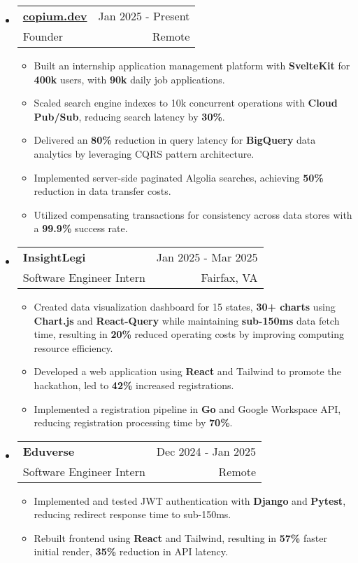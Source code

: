 \documentclass[letterpaper,11pt]{article}
\makeatletter
\newcommand{\resumeItem}[1]{
  \item{
    {#1}
  }
}
\newcommand{\resumeSubheading}[4]{
    \item
    \begin{tabular*}{0.985\textwidth}[t]{l@{\extracolsep{\fill}}r@{\hspace{-0.1in}}}
        {\textbf{#1}} & {#2} \\
        #3 &  #4 \\
    \end{tabular*}\vspace{-5pt}
}
\newcommand{\resumeSubHeadingListStart}{\begin{itemize}[leftmargin=0.00in, rightmargin=-0.2in, label={}]\vspace{3pt}}
\newcommand{\resumeSubHeadingListEnd}{\end{itemize}\vspace{-5pt}}
\newcommand{\resumeItemListStart}{\vspace{3pt}\begin{itemize}[leftmargin=0.15in, rightmargin=0.15in]}
\newcommand{\resumeItemListEnd}{\end{itemize}\vspace{-5pt}}
\makeatother
\begin{document}
\resumeSubHeadingListStart
\resumeSubheading
{\href{https://www.copium.dev}{copium.dev}} {Jan 2025 - Present}
{Founder} {Remote}
\resumeItemListStart 
\resumeItem{Built an internship application management platform with \textbf{SvelteKit} for \textbf{400k} users, with \textbf{90k} daily job applications.}
\resumeItem{Scaled search engine indexes to 10k concurrent operations with \textbf{Cloud Pub/Sub}, reducing search latency by \textbf{30\%}.}
\resumeItem{Delivered an \textbf{80\%} reduction in query latency for \textbf{BigQuery} data analytics by leveraging CQRS pattern architecture.}
\resumeItem{Implemented server-side paginated Algolia searches, achieving \textbf{50\%} reduction in data transfer costs.}
\resumeItem{Utilized compensating transactions for consistency across data stores with a \textbf{99.9\%} success rate.}
\resumeItemListEnd
\resumeSubHeadingListEnd

\resumeSubHeadingListStart
\resumeSubheading
{InsightLegi} {Jan 2025 - Mar 2025}
{Software Engineer Intern} {Fairfax, VA}
\resumeItemListStart 
\resumeItem{Created data visualization dashboard for 15 states, \textbf{30+ charts} using \textbf{Chart.js} and \textbf{React-Query} while maintaining \textbf{sub-150ms} data fetch time, resulting in \textbf{20\%} reduced operating costs by improving computing resource efficiency.}
\resumeItem{Developed a web application using \textbf{React} and Tailwind to promote the hackathon, led to \textbf{42\%} increased registrations.}
\resumeItem{Implemented a registration pipeline in \textbf{Go} and Google Workspace API, reducing registration processing time by \textbf{70\%}.}
\resumeItemListEnd
\resumeSubHeadingListEnd

\resumeSubHeadingListStart
\resumeSubheading
{Eduverse} {Dec 2024 - Jan 2025}
{Software Engineer Intern} {Remote}
\resumeItemListStart
\resumeItem{Implemented and tested JWT authentication with \textbf{Django} and \textbf{Pytest}, reducing redirect response time to sub-150ms.}
\resumeItem{Rebuilt frontend using \textbf{React} and Tailwind, resulting in \textbf{57\%} faster initial render, \textbf{35\%} reduction in API latency.}
\resumeItemListEnd
\resumeSubHeadingListEnd

\end{document}
